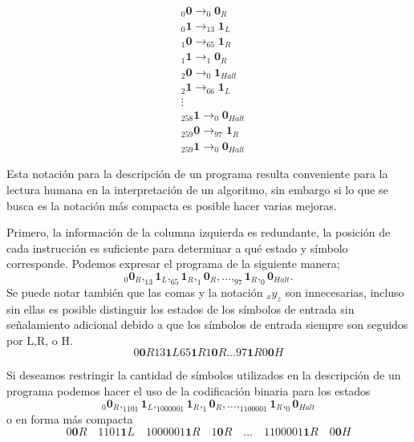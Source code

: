 \documentclass[10pt,a4paper]{article}
\begin{document}
\begin{align*}
	&_{0}\textbf{0} \rightarrow _{0}\textbf{0}_{R} \\
	&_{0}\textbf{1} \rightarrow _{13}\textbf{1}_{L} \\
	&_{1}\textbf{0} \rightarrow _{65}\textbf{1}_{R} \\
	&_{1}\textbf{1} \rightarrow _{1}\textbf{0}_{R} \\
	&_{2}\textbf{0} \rightarrow _{0}\textbf{1}_{Halt} \\
	&_{2}\textbf{1} \rightarrow _{66}\textbf{1}_{L} \\
	& \vdots \\
	&_{258}\textbf{1} \rightarrow _{0}\textbf{0}_{Halt} \\
	&_{259}\textbf{0} \rightarrow _{97}\textbf{1}_{R} \\
	&_{259}\textbf{1} \rightarrow _{0}\textbf{0}_{Halt}
\end{align*}

Esta notación para la descripción de un programa resulta conveniente para la lectura humana en la interpretación de un algoritmo, sin embargo si lo que se busca es la notación más compacta es posible hacer varias mejoras.

Primero, la información de la columna izquierda es redundante, la posición de cada instrucción es suficiente para determinar a qué estado y símbolo corresponde. Podemos expresar el programa de la siguiente manera;
\[
	_{0}\textbf{0}_{R}, _{13}\textbf{1}_{L}, _{65}\textbf{1}_{R}, _{1}\textbf{0}_{R}, \dots, _{97}\textbf{1}_{R}, _{0}\textbf{0}_{Halt}.
\]
Se puede notar también que las comas y la notación $_{x}y_z$ son innecesarias, incluso sin ellas es posible distinguir los estados de los símbolos de entrada sin señalamiento adicional debido a que los símbolos de entrada siempre son seguidos por  L,R, o H.
\[
	0 \textbf{0} R 13 \textbf{1} L 65 \textbf{1} R 1 \textbf{0} R \dots 97 \textbf{1} R 0 \textbf{0} H
\]

Si deseamos restringir la cantidad de símbolos utilizados en la descripción de un programa podemos hacer el uso de la codificación binaria para los estados
\[
	_{0}\textbf{0}_{R}, _{1101}\textbf{1}_{L}, _{1000001}\textbf{1}_{R}, _{1}\textbf{0}_{R}, \dots, _{1100001}\textbf{1}_{R}, _{0}\textbf{0}_{Halt}
\]
o en forma más compacta
\[
	0 \textbf{0} R \quad 1101 \textbf{1} L \quad 1000001 \textbf{1} R \quad 1 \textbf{0} R \quad \dots \quad 1100001 \textbf{1} R \quad 0 \textbf{0} H
\]
\end{document}
